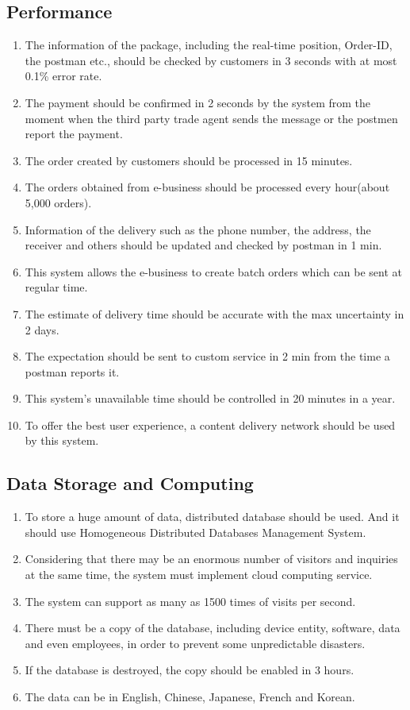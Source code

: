 \documentclass[12pt]{scrreprt}
\begin{document}
\subsection{Performance}
\begin{enumerate}
  \item The information of the package, including the real-time position,
  Order-ID, the postman etc., should be checked by customers in 3 seconds
  with at most 0.1\% error rate.
  \item The payment should be confirmed in 2 seconds by the system from
  the moment when the third party trade agent sends the message or the
  postmen report the payment.
  \item The order created by customers should be processed in 15 minutes.
  \item The orders obtained from e-business should be processed every
  hour(about 5,000 orders).
  \item Information of the delivery such as the phone number, the address,
  the receiver and others should be updated and checked by postman in 1 min.
  \item This system allows the e-business to create batch orders which can
  be sent at regular time.
  \item The estimate of delivery time should be accurate with the max
  uncertainty in 2 days.
  \item The expectation should be sent to custom service in 2 min from
  the time a postman reports it.
  \item This system’s unavailable time should be controlled in 20 minutes
  in a year.
  \item To offer the best user experience, a content delivery network
  should be used by this system.
\end{enumerate}

\subsection{Data Storage and Computing}
\begin{enumerate}
  \item To store a huge amount of data, distributed database should be used.
  And it should use Homogeneous Distributed Databases Management System.
  \item Considering that there may be an enormous number of visitors and
  inquiries at the same time, the system must implement cloud computing service.
  \item The system can support as many as 1500 times of visits per second.
  \item There must be a copy of the database, including device entity,
  software, data and even employees, in order to prevent some unpredictable
  disasters.
  \item If the database is destroyed, the copy should be enabled in 3 hours.
  \item The data can be in English, Chinese, Japanese, French and Korean.
\end{enumerate}
\end{document}

